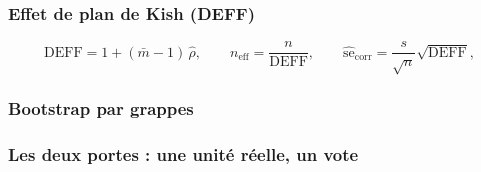 \subsubsection*{Effet de plan de Kish (DEFF)}
\[
  \mathrm{DEFF} = 1 + (\bar m - 1)\,\hat\rho,
  \qquad n_{\mathrm{eff}} = \frac{n}{\mathrm{DEFF}},
  \qquad \widehat{\mathrm{se}}_{\mathrm{corr}}
        = \frac{s}{\sqrt{n}}\sqrt{\mathrm{DEFF}},
\]

\subsubsection*{Bootstrap par grappes}

\subsubsection*{Les deux portes : une unité réelle, un vote}

